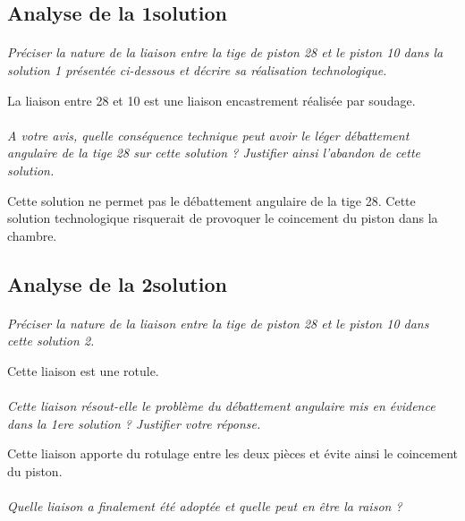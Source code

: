 \documentclass[11pt,oneside]{article}
\begin{document}
\subsection*{Analyse de la 1\iere solution}

\paragraph{}
\textit{Préciser la nature de la liaison entre la tige de piston 28 et le piston 10 dans la solution 1 présentée ci-dessous et décrire sa réalisation technologique.}

La liaison entre 28 et 10 est une liaison encastrement réalisée par soudage. 


\paragraph{}
\textit{A votre avis, quelle conséquence technique peut avoir le léger débattement angulaire de la tige 28 sur cette solution ? Justifier ainsi l'abandon de cette solution.}

Cette solution ne permet pas le débattement angulaire de la tige 28. Cette solution technologique risquerait de provoquer le coincement du piston dans la chambre.

\subsection*{Analyse de la 2\ieme solution}

\paragraph{}
\textit{Préciser la nature de la liaison entre la tige de piston 28 et le piston 10 dans cette solution 2.}

Cette liaison est une rotule.

\paragraph{}
\textit{Cette liaison résout-elle le problème du débattement angulaire mis en évidence dans la 1ere solution ? Justifier votre réponse.}

Cette liaison apporte du rotulage entre les deux pièces et évite ainsi le coincement du piston.


\paragraph{}
\textit{Quelle liaison a finalement été adoptée et quelle peut en être la raison ?}
\end{document}

